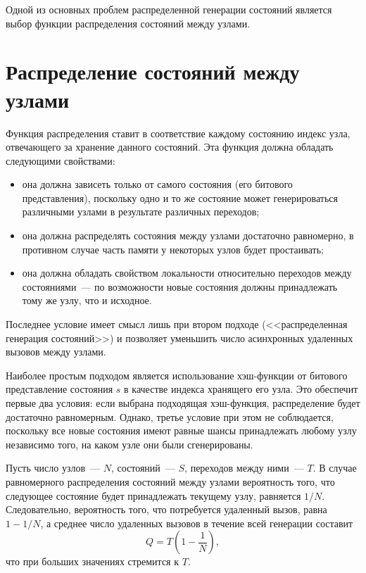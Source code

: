 \documentclass[12pt,a4paper,fleqn]{article}
\begin{document}
Одной из основных проблем распределенной генерации состояний является выбор функции распределения состояний между
узлами.

\section{Распределение состояний между узлами}
\label{sec:state-partition}

Функция распределения ставит в соответствие каждому состоянию индекс узла, отвечающего за хранение данного
состояний. Эта функция должна обладать следующими свойствами:

\begin{itemize}
\item она должна зависеть только от самого состояния (его битового представления), поскольку одно и то же состояние
  может генерироваться различными узлами в результате различных переходов;

\item она должна распределять состояния между узлами достаточно равномерно, в противном случае часть памяти у некоторых
  узлов будет простаивать;

\item она должна обладать свойством локальности относительно переходов между состояниями~--- по возможности новые
  состояния должны принадлежать тому же узлу, что и исходное.
\end{itemize}

Последнее условие имеет смысл лишь при втором подходе (<<распределенная генерация состояний>>) и позволяет уменьшить число
асинхронных удаленных вызовов между узлами.

Наиболее простым подходом является использование хэш-функции от битового представление состояния $s$ в качестве индекса
хранящего его узла. Это обеспечит первые два условия: если выбрана подходящая хэш-функция, распределение будет
достаточно равномерным. Однако, третье условие при этом не соблюдается, поскольку все новые состояния имеют равные шансы
принадлежать любому узлу независимо того, на каком узле они были сгенерированы.

Пусть число узлов~--- $N$, состояний~--- $S$, переходов между ними~--- $T$. В случае равномерного распределения
состояний между узлами вероятность того, что следующее состояние будет принадлежать текущему узлу, равняется
$1/N$. Следовательно, вероятность того, что потребуется удаленный вызов, равна $1 - 1/N$, а среднее число удаленных
вызовов в течение всей генерации составит 
\begin{equation}
  \label{eq:rpc-partfull}
  Q = T (1 - \frac{1}{N}),
\end{equation}
что при больших значениях стремится к $T$.
\end{document}
